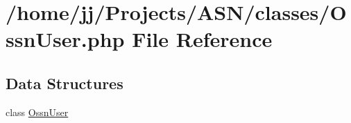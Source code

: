 \hypertarget{_ossn_user_8php}{}\section{/home/jj/\+Projects/\+A\+S\+N/classes/\+Ossn\+User.php File Reference}
\label{_ossn_user_8php}
\subsection*{Data Structures}
\begin{DoxyCompactItemize}
\item 
class \hyperlink{class_ossn_user}{Ossn\+User}
\end{DoxyCompactItemize}
